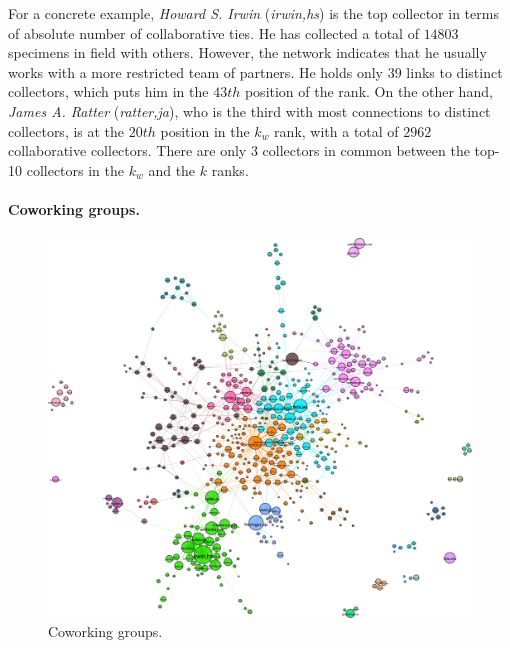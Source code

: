 For a concrete example, \textit{Howard S. Irwin} (\textit{irwin,hs}) is the top collector in terms of absolute number of collaborative ties. He has collected a total of $14803$ specimens in field with others. However, the network indicates that he usually works with a more restricted team of partners. He holds only $39$ links to distinct collectors, which puts him in the $43th$ position of the rank. 
On the other hand, \textit{James A. Ratter} (\textit{ratter,ja}), who is the third with most connections to distinct collectors, is at the $20th$ position in the $k_w$ rank, with a total of $2962$ collaborative collectors.
There are only $3$ collectors in common between the top-10 collectors in the $k_w$ and the $k$ ranks.

\paragraph*{Coworking groups.}
\begin{figure}[!ht]
  	\centering
    \includegraphics[width=\linewidth]{figures/casestudy_ub/cwn_communities.pdf}
    \caption{ Coworking groups.}
    \label{fig:ub_cwn_communities}
\end{figure}

